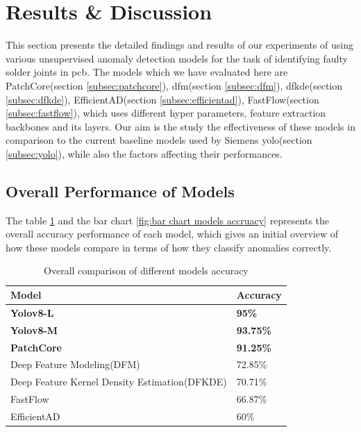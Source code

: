 \section{Results \& Discussion}

This section presents the detailed findings and results of our experiments of using various unsupervised anomaly detection models for the task of identifying faulty solder joints in \gls{pcb}. The models which we have evaluated here are PatchCore(section \ref{subsec:patchcore}), \gls{dfm}(section \ref{subsec:dfm}), \gls{dfkde}(section \ref{subsec:dfkde}), EfficientAD(section \ref{subsec:efficientad}), FastFlow(section \ref{subsec:fastflow}), which uses different hyper parameters, feature extraction backbones and its layers. Our aim is the study the effectiveness of these models in comparison to the current baseline models used by Siemens \gls{yolo}(section \ref{subsec:yolo}), while also the factors affecting their performances.

\subsection{Overall Performance of Models}

The table \ref{tab:overall model accuracy} and the bar chart \ref{fig:bar chart models accruacy} represents the overall accuracy performance of each model, which gives an initial overview of how these models compare in terms of how they classify anomalies correctly.

\begin{table}[ht!]
    \centering
    \begin{tabular}{|l|l|}
        \hline
        \textbf{Model} & \textbf{Accuracy} \\ \hline
        \textbf{Yolov8-L} & \textbf{95\%} \\ \hline
        \textbf{Yolov8-M} & \textbf{93.75\%} \\ \hline
        \textbf{PatchCore} & \textbf{91.25\%} \\ \hline
        Deep Feature Modeling(DFM) & 72.85\% \\ \hline
        Deep Feature Kernel Density Estimation(DFKDE) & 70.71\% \\ \hline
        FastFlow & 66.87\% \\ \hline
        EfficientAD & 60\% \\ \hline
    \end{tabular}
    \caption{Overall comparison of different models accuracy}
    \label{tab:overall model accuracy}
\end{table}

